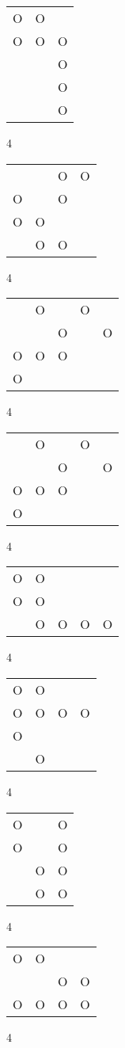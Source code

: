 \begin{tabular}{|m{0.2cm}m{0.2cm}m{0.2cm}|}\hline
O&O& \\
O&O&O\\
 & &O\\
 & &O\\
 & &O\\
\hline\end{tabular}4
\begin{tabular}{|m{0.2cm}m{0.2cm}m{0.2cm}m{0.2cm}|}\hline
 & &O&O\\
O& &O& \\
O&O& & \\
 &O&O& \\
\hline\end{tabular}4
\begin{tabular}{|m{0.2cm}m{0.2cm}m{0.2cm}m{0.2cm}m{0.2cm}|}\hline
 &O& &O& \\
 & &O& &O\\
O&O&O& & \\
O& & & & \\
\hline\end{tabular}4
\begin{tabular}{|m{0.2cm}m{0.2cm}m{0.2cm}m{0.2cm}m{0.2cm}|}\hline
 &O& &O& \\
 & &O& &O\\
O&O&O& & \\
O& & & & \\
\hline\end{tabular}4
\begin{tabular}{|m{0.2cm}m{0.2cm}m{0.2cm}m{0.2cm}m{0.2cm}|}\hline
O&O& & & \\
O&O& & & \\
 &O&O&O&O\\
\hline\end{tabular}4
\begin{tabular}{|m{0.2cm}m{0.2cm}m{0.2cm}m{0.2cm}|}\hline
O&O& & \\
O&O&O&O\\
O& & & \\
 &O& & \\
\hline\end{tabular}4
\begin{tabular}{|m{0.2cm}m{0.2cm}m{0.2cm}|}\hline
O& &O\\
O& &O\\
 &O&O\\
 &O&O\\
\hline\end{tabular}4
\begin{tabular}{|m{0.2cm}m{0.2cm}m{0.2cm}m{0.2cm}|}\hline
O&O& & \\
 & &O&O\\
O&O&O&O\\
\hline\end{tabular}4
